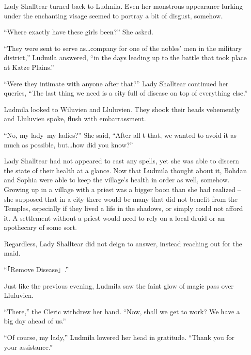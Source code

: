  

Lady Shalltear turned back to Ludmila. Even her monstrous appearance lurking under the enchanting visage seemed to portray a bit of disgust, somehow.

 

“Where exactly have these girls been?” She asked.

 

“They were sent to serve as…company for one of the nobles’ men in the military district,” Ludmila answered, “in the days leading up to the battle that took place at Katze Plains.”

 

“Were they intimate with anyone after that?” Lady Shalltear continued her queries, “The last thing we need is a city full of disease on top of everything else.”

 

Ludmila looked to Wiluvien and Lluluvien. They shook their heads vehemently and Lluluvien spoke, flush with embarrassment.

 

“No, my lady–my ladies?” She said, “After all t-that, we wanted to avoid it as much as possible, but…how did you know?”

 

Lady Shalltear had not appeared to cast any spells, yet she was able to discern the state of their health at a glance. Now that Ludmila thought about it, Bohdan and Sophia were able to keep the village’s health in order as well, somehow. Growing up in a village with a priest was a bigger boon than she had realized – she supposed that in a city there would be many that did not benefit from the Temples, especially if they lived a life in the shadows, or simply could not afford it. A settlement without a priest would need to rely on a local druid or an apothecary of some sort.

 

Regardless, Lady Shalltear did not deign to answer, instead reaching out for the maid.

 

“「Remove Disease」.”

 

Just like the previous evening, Ludmila saw the faint glow of magic pass over Lluluvien.

 

“There,” the Cleric withdrew her hand. “Now, shall we get to work? We have a big day ahead of us.”

 

“Of course, my lady,” Ludmila lowered her head in gratitude. “Thank you for your assistance.”